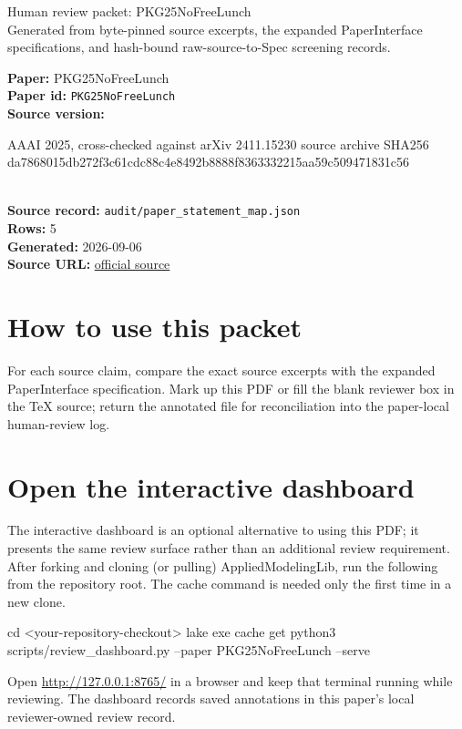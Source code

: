 \documentclass[10pt]{article}
\begin{document}
\fontsize{9}{10}\selectfont

\begin{center}
{\LARGE Human review packet: PKG25NoFreeLunch}\\[0.35em]
\small Generated from byte-pinned source excerpts, the expanded PaperInterface
specifications, and hash-bound raw-source-to-Spec screening records.
\end{center}

\noindent\textbf{Paper:} PKG25NoFreeLunch\\
\textbf{Paper id:} \texttt{PKG25NoFreeLunch}\\
\textbf{Source version:} \parbox[t]{0.76\linewidth}{\raggedright AAAI 2025, cross-checked against arXiv 2411.15230 source archive SHA256 da7868015db272f3c61cdc88c4e8492b8888f8363332215aa59c509471831c56}\\
\textbf{Source record:} \texttt{audit/paper\_statement\_map.json}\\
\textbf{Rows:} 5\\
\textbf{Generated:} 2026-09-06\\
\textbf{Source URL:} \href{https://ojs.aaai.org/index.php/AAAI/article/view/33574/35729}{official source}





\section*{How to use this packet}
For each source claim, compare the exact source excerpts with the expanded
PaperInterface specification. Mark up this PDF or fill the blank reviewer box in the TeX source;
return the annotated file for reconciliation into the paper-local human-review
log.

\section*{Open the interactive dashboard}
The interactive dashboard is an optional alternative to using this PDF; it
presents the same review surface rather than an additional review requirement.
After forking and cloning (or pulling) AppliedModelingLib, run the following from the
repository root. The cache command is needed only the first time in a new clone.
\begin{ReviewVerbatim}
cd <your-repository-checkout>
lake exe cache get
python3 scripts/review_dashboard.py --paper PKG25NoFreeLunch --serve
\end{ReviewVerbatim}
Open \url{http://127.0.0.1:8765/} in a browser and keep that terminal running
while reviewing. The dashboard records saved annotations in this paper's local
reviewer-owned review record.
\end{document}
